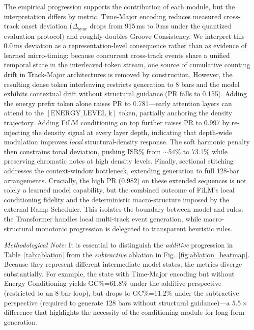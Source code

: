 \documentclass[pdflatex,sn-mathphys-num,twocolumn]{sn-jnl}
\theoremstyle{thmstyleone}
\theoremstyle{thmstyletwo}
\begin{document}
The empirical progression supports the contribution of each module, but the interpretation differs by metric. Time-Major encoding reduces measured cross-track onset deviation ($\Delta_{\mathrm{sync}}$ drops from 915\,ms to 0\,ms under the quantized evaluation protocol) and roughly doubles Groove Consistency. We interpret this 0.0\,ms deviation as a representation-level consequence rather than as evidence of learned micro-timing: because concurrent cross-track events share a unified temporal state in the interleaved token stream, one source of cumulative counting drift in Track-Major architectures is removed by construction. However, the resulting dense token interleaving restricts generation to 8 bars and the model exhibits contextual drift without structural guidance (PR falls to 0.155). Adding the energy prefix token alone raises PR to 0.781---early attention layers can attend to the $[\mathrm{ENERGY\_LEVEL\_k}]$ token, partially anchoring the density trajectory. Adding FiLM conditioning on top further raises PR to 0.997 by re-injecting the density signal at every layer depth, indicating that depth-wide modulation improves \emph{local} structural-density response. The soft harmonic penalty then constrains tonal deviation, pushing ISR\% from $\sim$54\% to 73.1\% while preserving chromatic notes at high density levels. Finally, sectional stitching addresses the context-window bottleneck, extending generation to full 128-bar arrangements. Crucially, the high PR ($0.982$) on these extended sequences is not solely a learned model capability, but the combined outcome of FiLM's local conditioning fidelity and the deterministic macro-structure imposed by the external Ramp Scheduler. This isolates the boundary between model and rules: the Transformer handles local multi-track event generation, while macro-structural monotonic progression is delegated to transparent heuristic rules.

\textit{Methodological Note:} It is essential to distinguish the \emph{additive} progression in Table~\ref{tab:ablation} from the \emph{subtractive} ablation in Fig.~\ref{fig:ablation_heatmap}. Because they represent different intermediate model states, the metrics diverge substantially. For example, the state with Time-Major encoding but without Energy Conditioning yields GC\%=61.8\% under the additive perspective (restricted to an 8-bar loop), but drops to GC\%=11.2\% under the subtractive perspective (required to generate 128 bars without structural guidance)---a $5.5\times$ difference that highlights the necessity of the conditioning module for long-form generation.
\end{document}
